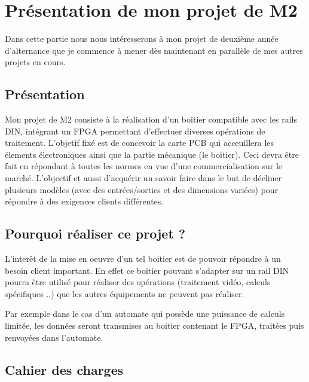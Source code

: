 \section{Présentation de mon projet de M2 }

Dans cette partie nous nous intéresserons à mon projet de deuxième année d'alternance que je commence à mener dès maintenant en parallèle de mes autres projets en cours. 

\subsection{Présentation}

Mon projet de M2 consiste à la réalisation d'un boitier compatible avec les rails DIN, intégrant un FPGA permettant d'effectuer diverses opérations de traitement. L'objetif fixé est de concevoir la carte PCB qui acceuillera les élements électroniques ainsi que la partie mécanique (le boitier). Ceci devra être fait en répondant à toutes les normes en vue d'une commercialisation sur le marché. 
\newline
L'objectif et aussi d'acquérir un savoir faire dans le but de décliner plusieurs modèles (avec des entrées/sorties et des dimensions variées) pour répondre à des exigences clients différentes.

\subsection {Pourquoi réaliser ce projet ? } 

L'interêt de la mise en oeuvre d'un tel boitier est de pouvoir répondre à un besoin client important. En effet ce boitier pouvant s'adapter sur un rail DIN pourra être utilisé pour réaliser des opérations (traitement vidéo, calculs spécifiques ..) que les autres équipements ne peuvent pas réaliser.

Par exemple dans le cas d'un automate qui possède une puissance de calculs limitée, les données seront transmises au boitier contenant le FPGA, traitées puis renvoyées dans l'automate. 

\subsection {Cahier des charges } 

